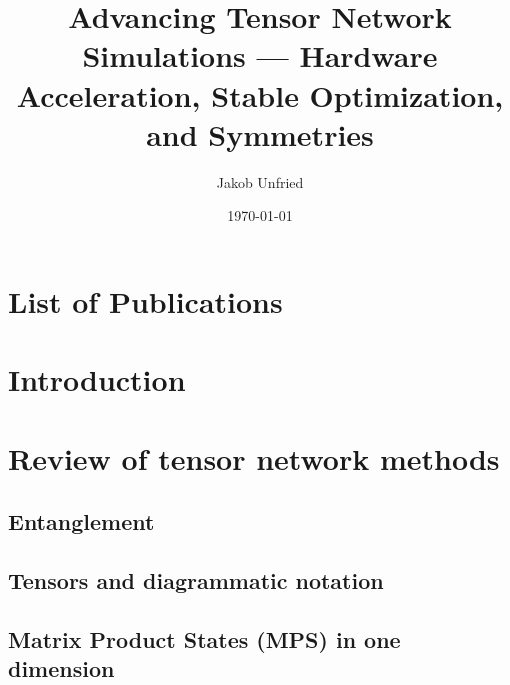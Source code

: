 \documentclass[12pt,a4paper]{book}
\title{Advancing Tensor Network Simulations — Hardware Acceleration, Stable Optimization, and Symmetries}
\author{Jakob Unfried}
\date{\today}
\begin{document}

\frontmatter

\cleardoublepage


\setcounter{tocdepth}{1}
\tableofcontents


\mainmatter

\chapter*{List of Publications}
\label{list_of_publications}


\chapter{Introduction}\label{ch:introduction}


\chapter{Review of tensor network methods}
\label{ch:tensornets}


\section{Entanglement}
\label{sec:tensornets:entanglement}


\section{Tensors and diagrammatic notation}
\label{sec:tensornets:tensors}


\section{Matrix Product States (MPS) in one dimension}
\label{sec:tensornets:mps}

\end{document}
